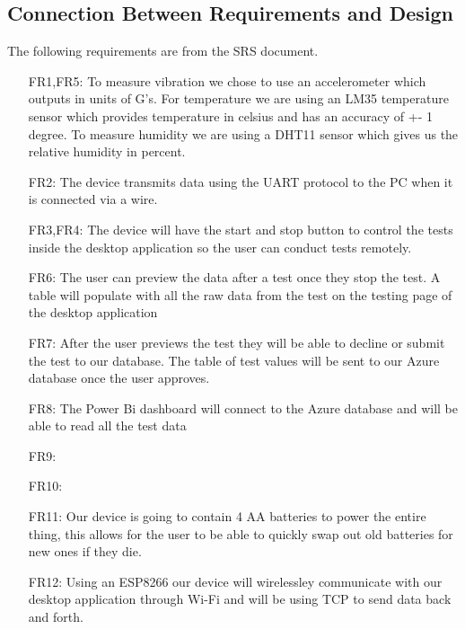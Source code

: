 \documentclass[12pt, titlepage]{article}
\begin{document}
\subsection{Connection Between Requirements and Design} \label{SecConnection}
The following requirements are from the SRS document.

\begin{itemize}
  \item[FR1,FR5:] To measure vibration we chose to use an accelerometer which outputs in units of G's. For temperature we are using an LM35 temperature sensor which provides temperature in celsius and has an accuracy of +- 1 degree. To measure humidity we are using a DHT11 sensor which gives us the relative humidity in percent.
  \item[FR2:] The device transmits data using the UART protocol to the PC when it is connected via a wire.
  \item[FR3,FR4:] The device will have the start and stop button to control the tests inside the desktop application so the user can conduct tests remotely.
  \item[FR6:] The user can preview the data after a test once they stop the test. A table will populate with all the raw data from the test on the testing page of the desktop application
  \item[FR7:] After the user previews the test they will be able to decline or submit the test to our database. The table of test values will be sent to our Azure database once the user approves.
  \item[FR8:] The Power Bi dashboard will connect to the Azure database and will be able to read all the test data
  \item[FR9:]
  \item[FR10:]
  \item[FR11:] Our device is going to contain 4 AA batteries to power the entire thing, this allows for the user to be able to quickly swap out old batteries for new ones if they die.
  \item[FR12:] Using an ESP8266 our device will wirelessley communicate with our desktop application through Wi-Fi and will be using TCP to send data back and forth.
  \item[]        
  
\end{itemize}

\end{document}
